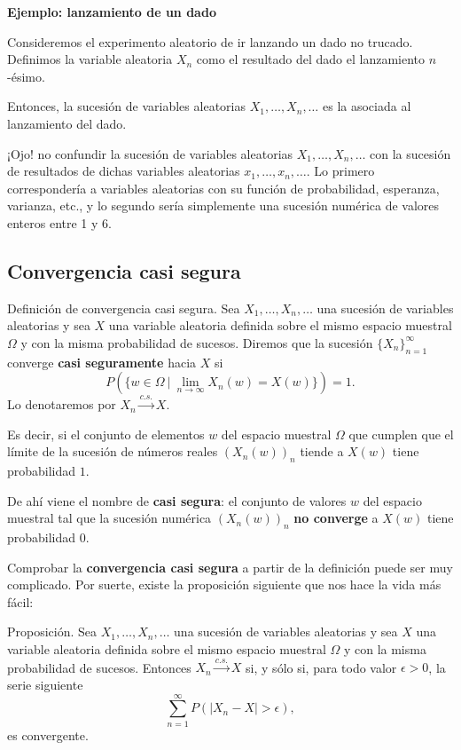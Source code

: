 \documentclass[]{book}
\begin{document}
\textbf{Ejemplo: lanzamiento de un dado}

Consideremos el experimento aleatorio de ir lanzando un dado no trucado. Definimos la variable aleatoria \(X_n\) como el resultado del dado el lanzamiento \(n\)-ésimo.

Entonces, la sucesión de variables aleatorias \(X_1,\ldots,X_n,\ldots\) es la asociada al lanzamiento del dado.

¡Ojo! no confundir la sucesión de variables aleatorias \(X_1,\ldots,X_n,\ldots\) con la sucesión de resultados de dichas variables aleatorias \(x_1,\ldots, x_n,\ldots\). Lo primero correspondería a variables aleatorias con su función de probabilidad, esperanza, varianza, etc., y lo segundo sería simplemente una sucesión numérica de valores enteros entre 1 y 6.

\hypertarget{convergencia-casi-segura}{%
\subsection{Convergencia casi segura}\label{convergencia-casi-segura}}

 Definición de convergencia casi segura.
Sea \(X_1,\ldots,X_n,\ldots\) una sucesión de variables aleatorias y sea \(X\) una variable aleatoria definida sobre el mismo espacio muestral \(\Omega\) y con la misma probabilidad de sucesos. Diremos que la sucesión \(\{X_n\}_{n=1}^\infty\) converge \textbf{casi seguramente} hacia \(X\) si
\[
P\left(\{w\in \Omega\ |\ \lim_{n\to\infty} X_n(w)=X(w)\}\right)=1.
\]
Lo denotaremos por \(X_n\stackrel{c.s.}{\longrightarrow}X\).

Es decir, si el conjunto de elementos \(w\) del espacio muestral \(\Omega\) que cumplen que el límite de la sucesión de números reales \((X_n(w))_n\) tiende a \(X(w)\) tiene probabilidad \(1\).

De ahí viene el nombre de \textbf{casi segura}: el conjunto de valores \(w\) del espacio muestral tal que la sucesión numérica \((X_n(w))_n\) \textbf{no converge} a \(X(w)\) tiene probabilidad 0.

Comprobar la \textbf{convergencia casi segura} a partir de la definición puede ser muy complicado. Por suerte, existe la proposición siguiente que nos hace la vida más fácil:

 Proposición.
Sea \(X_1,\ldots,X_n,\ldots\) una sucesión de variables aleatorias y sea \(X\) una variable aleatoria definida sobre el mismo espacio muestral \(\Omega\) y con la misma probabilidad de sucesos.
Entonces \(X_n\stackrel{c.s.}{\longrightarrow}X\) si, y sólo si, para todo valor \(\epsilon >0\), la serie siguiente
\[
\sum_{n=1}^\infty P(|X_n-X|>\epsilon),
\]
es convergente.
\end{document}
